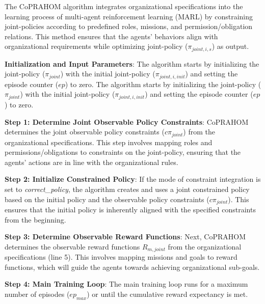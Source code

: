 \documentclass[conference]{IEEEtran}
\newcounter{relation}
\begin{document}

The CoPRAHOM algorithm integrates organizational specifications into the learning process of multi-agent reinforcement learning (MARL) by constraining joint-policies according to predefined roles, missions, and permission/obligation relations. This method ensures that the agents' behaviors align with organizational requirements while optimizing joint-policy ($\pi_{joint,i,s}$) as output.

\textbf{Initialization and Input Parameters}: \quad
The algorithm starts by initializing the joint-policy ($\pi_{joint}$) with the initial joint-policy ($\pi_{joint,i,init}$) and setting the episode counter ($ep$) to zero.
The algorithm starts by initializing the joint-policy ($\pi_{joint}$) with the initial joint-policy ($\pi_{joint,i,init}$) and setting the episode counter ($ep$) to zero.

\textbf{Step 1: Determine Joint Observable Policy Constraints}: \quad
CoPRAHOM determines the joint observable policy constraints ($c\pi_{joint}$) from the organizational specifications. This step involves mapping roles and permissions/obligations to constraints on the joint-policy, ensuring that the agents' actions are in line with the organizational rules.

\textbf{Step 2: Initialize Constrained Policy}: \quad
If the mode of constraint integration is set to \textit{correct\_policy}, the algorithm creates and uses a joint constrained policy based on the initial policy and the observable policy constraints ($c\pi_{joint}$). This ensures that the initial policy is inherently aligned with the specified constraints from the beginning.

\textbf{Step 3: Determine Observable Reward Functions}: \quad
Next, CoPRAHOM determines the observable reward functions $R_{m,joint}$ from the organizational specifications (line 5). This involves mapping missions and goals to reward functions, which will guide the agents towards achieving organizational sub-goals.

\textbf{Step 4: Main Training Loop}: \quad
The main training loop runs for a maximum number of episodes ($ep_{max}$) or until the cumulative reward expectancy is met.
\end{document}
